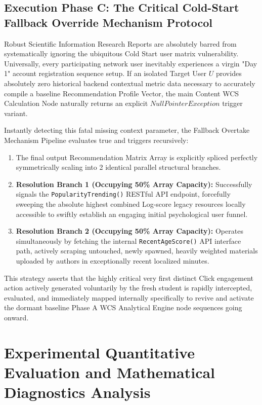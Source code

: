 \documentclass[journal]{IEEEtran}
\begin{document}
\subsection{Execution Phase C: The Critical Cold-Start Fallback Override Mechanism Protocol}

Robust Scientific Information Research Reports are absolutely barred from systematically ignoring the ubiquitous Cold Start user matrix vulnerability. 
Universally, every participating network user inevitably experiences a virgin "Day 1" account registration sequence setup. 
If an isolated Target User $U$ provides absolutely zero historical backend contextual metric data necessary to accurately compile a baseline Recommendation Profile Vector, 
the main Content WCS Calculation Node naturally returns an explicit $NullPointerException$ trigger variant.

Instantly detecting this fatal missing context parameter, the Fallback Overtake Mechanism Pipeline evaluates true and triggers recursively:
\begin{enumerate}
    \item The final output Recommendation Matrix Array is explicitly spliced perfectly symmetrically scaling into 2 identical parallel structural branches.
    \item \textbf{Resolution Branch 1 (Occupying 50\% Array Capacity):} Successfully signals the \texttt{PopularityTrending()} RESTful API endpoint, forcefully sweeping the absolute highest combined Log-score legacy resources locally accessible to swiftly establish an engaging initial psychological user funnel.
    \item \textbf{Resolution Branch 2 (Occupying 50\% Array Capacity):} Operates simultaneously by fetching the internal \texttt{RecentAgeScore()} API interface path, actively scraping untouched, newly spawned, heavily weighted materials uploaded by authors in exceptionally recent localized minutes.
\end{enumerate}
This strategy asserts that the highly critical very first distinct Click engagement action actively generated voluntarily by the fresh student is rapidly intercepted, evaluated, and immediately mapped internally specifically to revive and activate the dormant baseline Phase A WCS Analytical Engine node sequences going onward.

\section{Experimental Quantitative Evaluation and Mathematical Diagnostics Analysis}
\label{sec:results}
\end{document}
